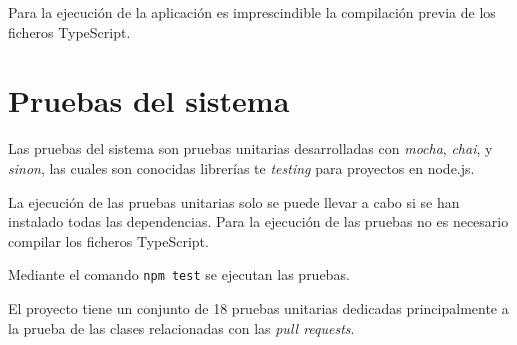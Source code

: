 Para la ejecución de la aplicación es imprescindible la compilación previa de los ficheros TypeScript.


\section{Pruebas del sistema}

Las pruebas del sistema son pruebas unitarias desarrolladas con \textit{mocha}, \textit{chai}, y \textit{sinon}, las cuales son conocidas librerías te \textit{testing} para proyectos en node.js.

La ejecución de las pruebas unitarias solo se puede llevar a cabo si se han instalado todas las dependencias. Para la ejecución de las pruebas no es necesario compilar los ficheros TypeScript.

Mediante el comando \texttt{npm test} se ejecutan las pruebas.

El proyecto tiene un conjunto de 18 pruebas unitarias dedicadas principalmente a la prueba de las clases relacionadas con las \textit{pull requests}.

